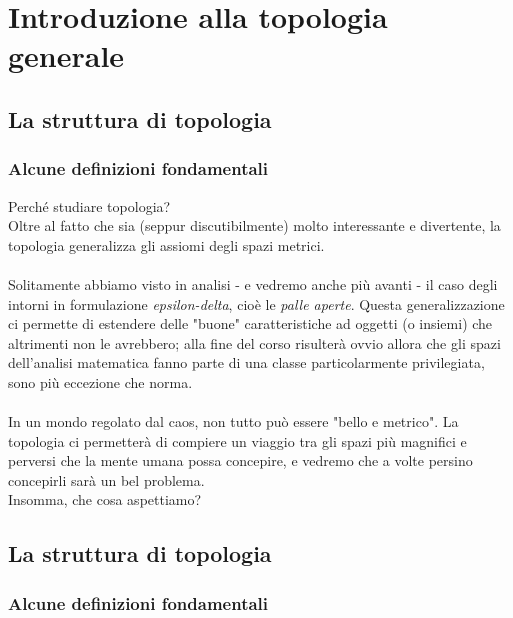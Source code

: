\chapter{Introduzione alla topologia generale}

\section{La struttura di topologia}
\subsection{\textcolor{TopGener}{\textbf{Alcune definizioni fondamentali}}}


Perché studiare topologia? \\
Oltre al fatto che sia (seppur discutibilmente) molto interessante e divertente, la topologia generalizza gli assiomi degli spazi metrici. \\ \\ 
Solitamente abbiamo visto in analisi - e vedremo anche più avanti - il caso degli intorni in formulazione \textit{epsilon-delta}, cioè le \textit{palle aperte}. Questa generalizzazione ci permette di estendere delle "buone" caratteristiche ad oggetti (o insiemi) che altrimenti non le avrebbero; alla fine del corso risulterà ovvio allora che gli spazi dell'analisi matematica fanno parte di una classe particolarmente privilegiata, sono più eccezione che norma. \\ \\ In un mondo regolato dal caos, non tutto può essere "bello e metrico". La topologia ci permetterà di compiere un viaggio tra gli spazi più magnifici e perversi che la mente umana possa concepire, e vedremo che a volte persino concepirli sarà un bel problema. \\
Insomma, che cosa aspettiamo?



\newpage
\section{La struttura di topologia}
\subsection{\textcolor{TopGener}{\textbf{Alcune definizioni fondamentali}}}


